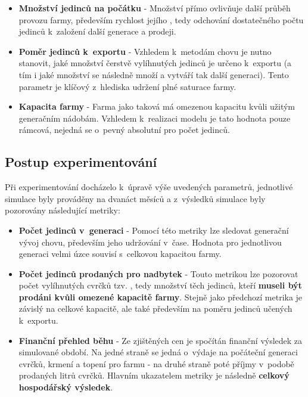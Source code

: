 \documentclass[11pt, a4paper, titlepage]{article}
\begin{document}
    \begin{itemize}
        \item \textbf{Množství jedinců na počátku} - Množství přímo ovlivňuje další průběh provozu farmy, především rychlost
        jejího , tedy odchování dostatečného počtu jedinců k~založení další generace a prodeji.

        \item \textbf{Poměr jedinců k~exportu} - Vzhledem k~metodám chovu je nutno stanovit, jaké množství čerstvě
        vylíhnutých jedinců je určeno k~exportu (a tím i jaké množství se následně množí a vytváří tak další generaci).
        Tento parametr je klíčový z~hlediska udržení plné saturace farmy.

        \item \textbf{Kapacita farmy} - Farma jako taková má omezenou kapacitu kvůli užitým generačním nádobám. Vzhledem
        k~realizaci modelu je tato hodnota pouze rámcová, nejedná se o~pevný absolutní  pro počet jedinců.
    \end{itemize}

    \subsection{Postup experimentování}

    Při experimentování docházelo k~úpravě výše uvedených parametrů, jednotlivé simulace byly prováděny na dvanáct měsíců
    a z~výsledků simulace byly pozorovány následující metriky:

    \begin{itemize}
        \item \textbf{Počet jedinců v~generaci} - Pomocí této metriky lze sledovat generační vývoj chovu, především
        jeho udržování v~čase. Hodnota pro jednotlivou generaci velmi úzce souvisí s~celkovou kapacitou farmy.
        \item \textbf{Počet jedinců prodaných pro nadbytek} - Touto metrikou lze pozorovat počet vylíhnutých cvrčků tzv.
        , tedy množství těch jedinců, kteří \textbf{museli být prodáni kvůli omezené kapacitě farmy}. Stejně jako předchozí metrika
        je závislý na celkové kapacitě, ale také především na poměru jedinců učených k~exportu.
        \item \textbf{Finanční přehled běhu} - Ze zjištěných cen je spočítán finanční výsledek za simulované období.
        Na jedné straně se jedná o~výdaje na počáteční generaci cvrčků, krmení a topení pro farmu - na druhé straně poté
        příjmy v~podobě prodaných litrů cvrčků. Hlavním ukazatelem metriky je následně \textbf{celkový hospodářský výsledek}.
    \end{itemize}
\end{document}
